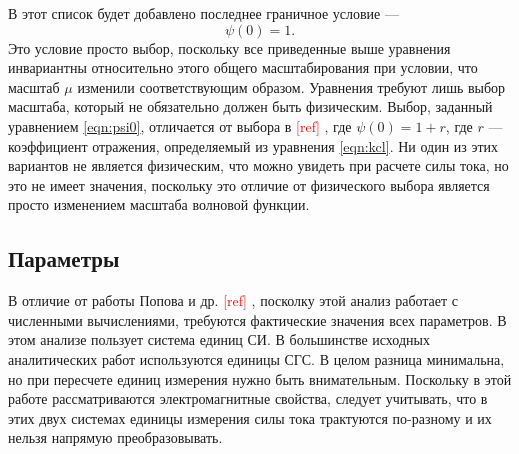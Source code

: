 \documentclass[A4,12pt,oneside]{article}
\renewcommand{\(}{\left(}
\renewcommand{\)}{\right)}
\newcommand{\citeph}{\textcolor{red}{[ref] }}
\begin{document}
В этот список будет добавлено последнее граничное условие —
\begin{equation}\label{eqn:psi0}
\psi\left(0\right) = 1.
\end{equation}
Это условие просто выбор, поскольку все приведенные выше уравнения инвариантны относительно этого общего масштабирования при условии, что масштаб $\mu$ изменили соответствующим образом. Уравнения требуют лишь выбор масштаба, который не обязательно должен быть физическим. Выбор, заданный уравнением \ref{eqn:psi0}, отличается от выбора в \citeph, где $\psi\left(0\right) = 1 + r$, где $r$ — коэффициент отражения, определяемый из уравнения \ref{eqn:kcl}. Ни один из этих вариантов не является физическим, что можно увидеть при расчете силы тока, но это не имеет значения, поскольку это отличие от физического выбора является просто изменением масштаба волновой функции.

\subsection{Параметры}
В отличие от работы Попова и др. \citeph, посколку этой анализ работает с численными вычислениями, требуются фактические значения всех параметров. В этом анализе пользует система единиц СИ. В большинстве исходных аналитических работ используются единицы СГС. В целом разница минимальна, но при пересчете единиц измерения нужно быть внимательным. Поскольку в этой работе рассматриваются электромагнитные свойства, 
следует учитывать, что в этих двух системах единицы измерения силы тока трактуются по-разному и их нельзя напрямую преобразовывать. 
 
\end{document}
